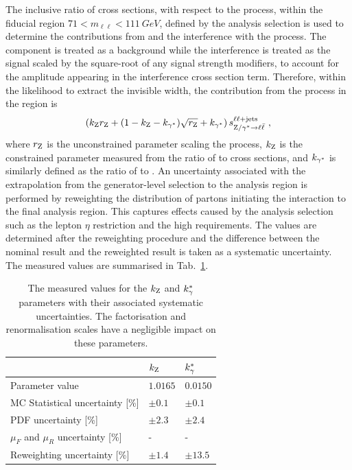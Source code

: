 %
The inclusive ratio of cross sections, with respect to the \IDYll process, within the fiducial region ${71<m_{\ell\ell}<\SI{111}{GeV}}$, defined by the analysis selection is used to determine the contributions from \Igstarll and the interference with the \IZll process. The \Igstarll component is treated as a background while the interference is treated as the \IZll signal scaled by the square-root of any signal strength modifiers, to account for the \IZll amplitude appearing in the interference cross section term. Therefore, within the likelihood to extract the \PZ invisible width, the contribution from the \IDYll process in the \diellplusjets region is
%
\begin{equation}
    \left(k_{\mathrm{Z}}r_{\mathrm{Z}} + (1 - k_{\mathrm{Z}} - k_{\gamma^{*}})\sqrt{r_{\mathrm{Z}}} + k_{\gamma^{*}}\right)s_{{\mathrm{Z}/\gamma^{*}\rightarrow \ell\bar{\ell}}}^{\ell\ell+\mathrm{jets}}\ ,
\end{equation}
%
where $r_\mathrm{Z}$ is the unconstrained parameter scaling the \IZll process, $k_{\mathrm{Z}}$ is the constrained parameter measured from the ratio of \IZll to \IDYll cross sections, and $k_{\gamma^{*}}$ is similarly defined as the ratio of \Igstarll to \IDYll. An uncertainty associated with the extrapolation from the generator-level selection to the analysis region is performed by reweighting the distribution of partons initiating the interaction to the final analysis region. This captures effects caused by the analysis selection such as the lepton $\eta$ restriction and the high \recoil requirements. The values are determined after the reweighting procedure and the difference between the nominal result and the reweighted result is taken as a systematic uncertainty. The measured values are summarised in Tab.~\ref{tab:gstar-corrections}.

\begin{table}[htb]
    \centering
    \begin{tabular}{lll}
        \hline%
        & $k_\mathrm{Z}$ & $k_\gamma^{*}$ \\
        \hline
        Parameter value &  $1.0165$ & $0.0150$ \\
        MC Statistical uncertainty [\%] & $\pm 0.1$ & $\pm 0.1$ \\
        PDF uncertainty [\%] & $\pm 2.3$ & $\pm 2.4$ \\
        $\mu_F$ and $\mu_R$ uncertainty [\%] & - & - \\
        Reweighting uncertainty [\%] & $\pm 1.4$ & $\pm 13.5$ \\
        \hline%
    \end{tabular}
    \caption[Contributions to the \IDYll from the \IZll and \Igstarll processes.]{
        The measured values for the $k_\mathrm{Z}$ and $k_\gamma^{*}$ parameters with their associated systematic uncertainties. The factorisation and renormalisation scales have a negligible impact on these parameters.
    }
    \label{tab:gstar-corrections}
\end{table}


